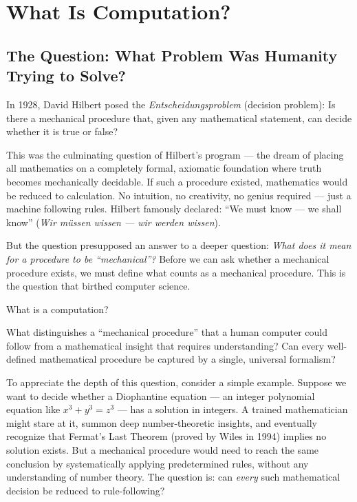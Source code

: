 
\chapter{What Is Computation?}
\label{ch:computation}

\section{The Question: What Problem Was Humanity Trying to Solve?}
\label{sec:computation:question}

In 1928, David Hilbert posed the \emph{Entscheidungsproblem} (decision problem): Is there a mechanical procedure that, given any mathematical statement, can decide whether it is true or false?

This was the culminating question of Hilbert's program --- the dream of placing all mathematics on a completely formal, axiomatic foundation where truth becomes mechanically decidable. If such a procedure existed, mathematics would be reduced to calculation. No intuition, no creativity, no genius required --- just a machine following rules. Hilbert famously declared: ``We must know --- we shall know'' (\emph{Wir m\"ussen wissen --- wir werden wissen}).

But the question presupposed an answer to a deeper question: \emph{What does it mean for a procedure to be ``mechanical''?} Before we can ask whether a mechanical procedure exists, we must define what counts as a mechanical procedure. This is the question that birthed computer science.

What is a computation?

What distinguishes a ``mechanical procedure'' that a human computer could follow from a mathematical insight that requires understanding? Can every well-defined mathematical procedure be captured by a single, universal formalism?

To appreciate the depth of this question, consider a simple example. Suppose we want to decide whether a Diophantine equation --- an integer polynomial equation like $x^3 + y^3 = z^3$ --- has a solution in integers. A trained mathematician might stare at it, summon deep number-theoretic insights, and eventually recognize that Fermat's Last Theorem (proved by Wiles in 1994) implies no solution exists. But a mechanical procedure would need to reach the same conclusion by systematically applying predetermined rules, without any understanding of number theory. The question is: can \emph{every} such mathematical decision be reduced to rule-following?

